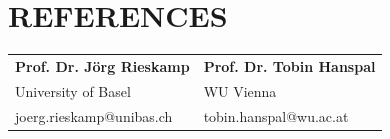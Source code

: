 \documentclass[10pt]{article}
\begin{document}
\section*{REFERENCES}
\begin{tabular}{@{}p{7.5cm}p{7.5cm}@{}}
\textbf{Prof. Dr. J\"{o}rg Rieskamp} & \textbf{Prof. Dr. Tobin Hanspal} \\
University of Basel & WU Vienna \\
joerg.rieskamp@unibas.ch & tobin.hanspal@wu.ac.at \\
\end{tabular}
\end{document}
